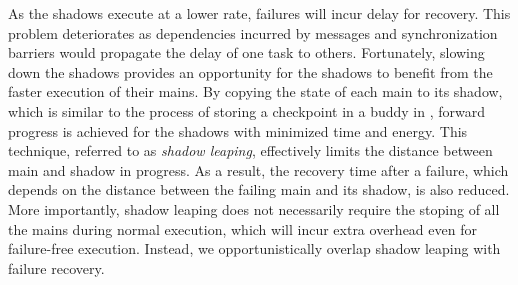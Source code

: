 As the shadows execute at a lower rate, failures will incur delay for recovery. This problem deteriorates as dependencies incurred by messages and synchronization barriers would propagate the delay of one task to others.  
Fortunately, slowing down the shadows provides an opportunity for the shadows to benefit from the faster execution of their mains. By copying the state of each main to its shadow, which is similar to the process of storing a checkpoint in a buddy in \cite{zheng_2004_ftccharm}, forward progress is achieved for the shadows with minimized time and energy. This technique, referred to as \textit{shadow leaping}, effectively limits the distance between main and shadow in progress. 
As a result, the recovery time after a failure, which depends on the distance between the failing main 
and its shadow, is also reduced. 
More importantly, shadow leaping does not necessarily require the stoping of all the mains during normal execution, which will incur extra overhead even for failure-free execution. 
Instead, we opportunistically overlap shadow leaping with failure recovery. 

